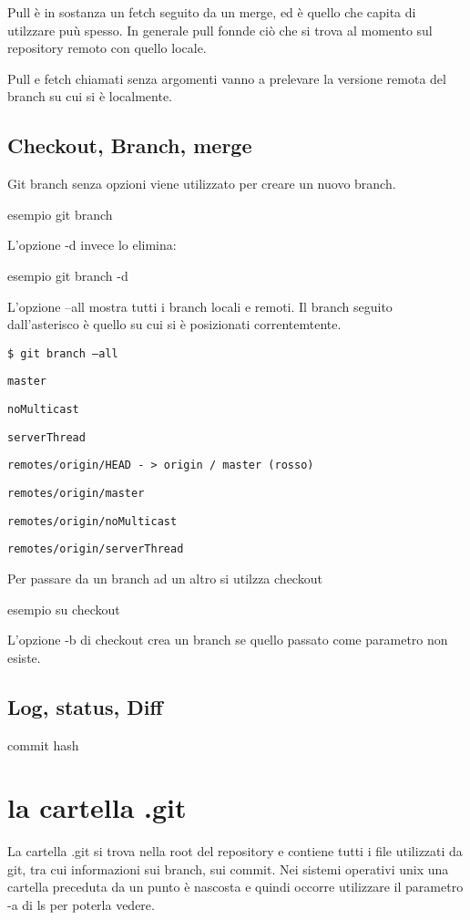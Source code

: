 \documentclass{article}
\begin{document}
Pull è in sostanza un fetch seguito da un merge, ed è quello che capita di
utilzzare puù spesso. In generale pull fonnde ciò che si trova al momento sul
repository remoto con quello locale.

Pull e fetch chiamati senza argomenti vanno a prelevare la versione remota del
branch su cui si è localmente.

\subsection{Checkout, Branch, merge}

Git branch senza opzioni viene utilizzato per creare un nuovo branch.

esempio git branch

L'opzione -d invece lo elimina:

esempio git branch -d

L'opzione --all mostra tutti i branch locali e remoti. Il branch seguito
dall'asterisco è quello su cui si è posizionati correntemtente.

\texttt{\$ git branch --all}

\texttt{master}

\texttt{noMulticast}

\texttt{serverThread}

\texttt{remotes/origin/HEAD - > origin / master (rosso)}

\texttt{remotes/origin/master}

\texttt{remotes/origin/noMulticast}

\texttt{remotes/origin/serverThread}

Per passare da un branch ad un altro si utilzza checkout

esempio su checkout 

L'opzione -b di checkout crea un branch se quello passato come parametro non
esiste.

\subsection{Log, status, Diff}

commit hash

\section{la cartella .git}

La cartella .git si trova nella root del repository e contiene tutti i file
utilizzati da git, tra cui informazioni sui branch, sui commit. Nei sistemi
operativi unix una cartella preceduta da un punto è nascosta e quindi occorre
utilizzare il parametro -a di ls per poterla vedere.
\end{document}
